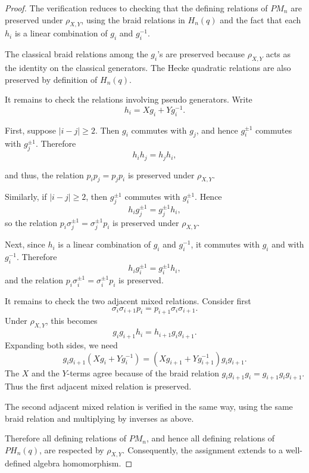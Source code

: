 \documentclass[11pt]{article}
\numberwithin{equation}{section}
\theoremstyle{definition}
\begin{document}
\begin{proof}
The verification reduces to checking that the defining relations of \(PM_n\) are preserved under \(\rho_{X,Y}\), using the braid relations in \(H_n(q)\) and the fact that each \(h_i\) is a linear combination of \(g_i\) and \(g_i^{-1}\).

\medskip 

The classical braid relations among the \(g_i\)'s are preserved because \(\rho_{X,Y}\) acts as the identity on the classical generators. The Hecke quadratic relations are also preserved by definition of \(H_n(q)\).

\medskip 

It remains to check the relations involving pseudo generators. Write
\[
h_i=Xg_i+Yg_i^{-1}.
\]

First, suppose \(|i-j|\geq 2\). Then \(g_i\) commutes with \(g_j\), and hence \(g_i^{\pm1}\) commutes with \(g_j^{\pm1}\). Therefore
\[
h_i h_j=h_j h_i,
\]

\noindent and thus, the relation \(p_i p_j = p_j p_i\) is preserved under \(\rho_{X,Y}\).

\medskip 

Similarly, if \(|i-j|\geq 2\), then \(g_j^{\pm1}\) commutes with
\(g_i^{\pm1}\). Hence
\[
h_i g_j^{\pm1}=g_j^{\pm1}h_i,
\]
\noindent so the relation \(p_i\sigma_j^{\pm1}=\sigma_j^{\pm1}p_i\) is preserved under \(\rho_{X,Y}\).

\medskip 

Next, since \(h_i\) is a linear combination of \(g_i\) and \(g_i^{-1}\), it
commutes with \(g_i\) and with \(g_i^{-1}\). Therefore
\[
h_i g_i^{\pm1}=g_i^{\pm1}h_i,
\]
\noindent and the relation \(p_i\sigma_i^{\pm1}=\sigma_i^{\pm1}p_i\) is preserved.

\medskip 

It remains to check the two adjacent mixed relations. Consider first
\[
\sigma_i\sigma_{i+1}p_i=p_{i+1}\sigma_i\sigma_{i+1}.
\]
Under \(\rho_{X,Y}\), this becomes
\[
g_i g_{i+1}h_i=h_{i+1}g_i g_{i+1}.
\]
Expanding both sides, we need
\[
g_i g_{i+1}(Xg_i+Yg_i^{-1})
=
(Xg_{i+1}+Yg_{i+1}^{-1})g_i g_{i+1}.
\]
The \(X\) and the \(Y\)-terms agree because of the braid relation \(g_i g_{i+1}g_i=g_{i+1}g_i g_{i+1}.\) Thus the first adjacent mixed relation is preserved.

\medskip 

The second adjacent mixed relation is verified in the same way, using the same braid relation and multiplying by inverses as above.

\medskip 

Therefore all defining relations of \(PM_n\), and hence all defining relations of \(PH_n(q)\), are respected by \(\rho_{X,Y}\). Consequently, the assignment extends to a well-defined algebra homomorphism.
\end{proof}
\end{document}

